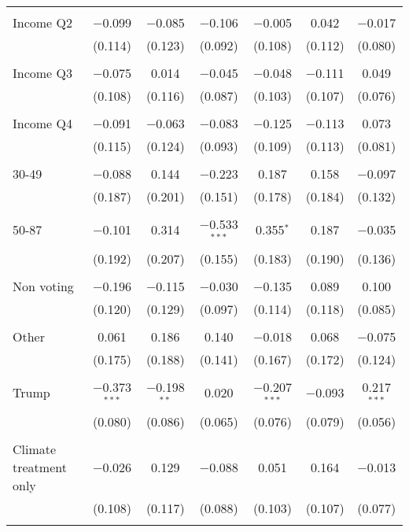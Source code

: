 \begin{tabular}{@{\extracolsep{5pt}}lcccccc}
  & & & & & & \\ 
 Income Q2 & $-$0.099 & $-$0.085 & $-$0.106 & $-$0.005 & 0.042 & $-$0.017 \\ 
  & (0.114) & (0.123) & (0.092) & (0.108) & (0.112) & (0.080) \\ 
  & & & & & & \\ 
 Income Q3 & $-$0.075 & 0.014 & $-$0.045 & $-$0.048 & $-$0.111 & 0.049 \\ 
  & (0.108) & (0.116) & (0.087) & (0.103) & (0.107) & (0.076) \\ 
  & & & & & & \\ 
 Income Q4 & $-$0.091 & $-$0.063 & $-$0.083 & $-$0.125 & $-$0.113 & 0.073 \\ 
  & (0.115) & (0.124) & (0.093) & (0.109) & (0.113) & (0.081) \\ 
  & & & & & & \\ 
 30-49 & $-$0.088 & 0.144 & $-$0.223 & 0.187 & 0.158 & $-$0.097 \\ 
  & (0.187) & (0.201) & (0.151) & (0.178) & (0.184) & (0.132) \\ 
  & & & & & & \\ 
 50-87 & $-$0.101 & 0.314 & $-$0.533$^{***}$ & 0.355$^{*}$ & 0.187 & $-$0.035 \\ 
  & (0.192) & (0.207) & (0.155) & (0.183) & (0.190) & (0.136) \\ 
  & & & & & & \\ 
 Non voting & $-$0.196 & $-$0.115 & $-$0.030 & $-$0.135 & 0.089 & 0.100 \\ 
  & (0.120) & (0.129) & (0.097) & (0.114) & (0.118) & (0.085) \\ 
  & & & & & & \\ 
 Other & 0.061 & 0.186 & 0.140 & $-$0.018 & 0.068 & $-$0.075 \\ 
  & (0.175) & (0.188) & (0.141) & (0.167) & (0.172) & (0.124) \\ 
  & & & & & & \\ 
 Trump & $-$0.373$^{***}$ & $-$0.198$^{**}$ & 0.020 & $-$0.207$^{***}$ & $-$0.093 & 0.217$^{***}$ \\ 
  & (0.080) & (0.086) & (0.065) & (0.076) & (0.079) & (0.056) \\ 
  & & & & & & \\ 
 Climate treatment only & $-$0.026 & 0.129 & $-$0.088 & 0.051 & 0.164 & $-$0.013 \\ 
  & (0.108) & (0.117) & (0.088) & (0.103) & (0.107) & (0.077) \\ 
  & & & & & & \\ 

\end{tabular}
